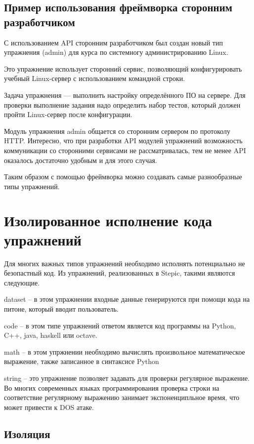 \documentclass{matmex-diploma-custom}
\begin{document}
\subsection{Пример использования фреймворка сторонним разработчиком}

С использованием API сторонним разработчиком был создан новый тип
упражнения (admin) для курса по системногу администрированию Linux.

Это упражнение использует сторонний сервис, позволяющий
конфигурировать учебный Linux-сервер с использованием командной
строки.

Задача упражнения --- выполнить настройку определённого ПО на
сервере. Для проверки выполнение задания надо определить набор тестов,
который должен пройти Linux-сервер после конфигурации.

Модуль упражнения admin общается со сторонним сервером по протоколу
HTTP. Интересно, что при разработки API модулей упражнений возможность
коммуникации со сторонними сервисами не рассматривалась, тем не менее
API оказалось достаточно удобным и для этого случая.

Таким образом с помощью фреймворка можно создавать самые разнообразные
типы упражнений.

\section{Изолированное исполнение кода упражнений}

Для многих важных типов упражнений необходимо исполнять потенциально
не безопастный код. Из упражнений, реализованных в Stepic, такими
являются следующие.

dataset -- в этом упражнении входные данные генерируются при помощи
кода на питоне, который вводит пользователь.

code -- в этом типе упражнений ответом является код программы на
Python, C++, java, haskell или octave.

math -- в этом упржнении необходимо вычислять произвольное
математическое выражение, также записанное в синтаксисе Python

string -- это упражнение позволяет задавать для проверки регулярное
выражение. Во многих современных языках программирования проверка
строки на соответствие регулярному выражению занимает экспоненципльное
время, что может привести к DOS атаке.

\subsection{Изоляция}
\end{document}
